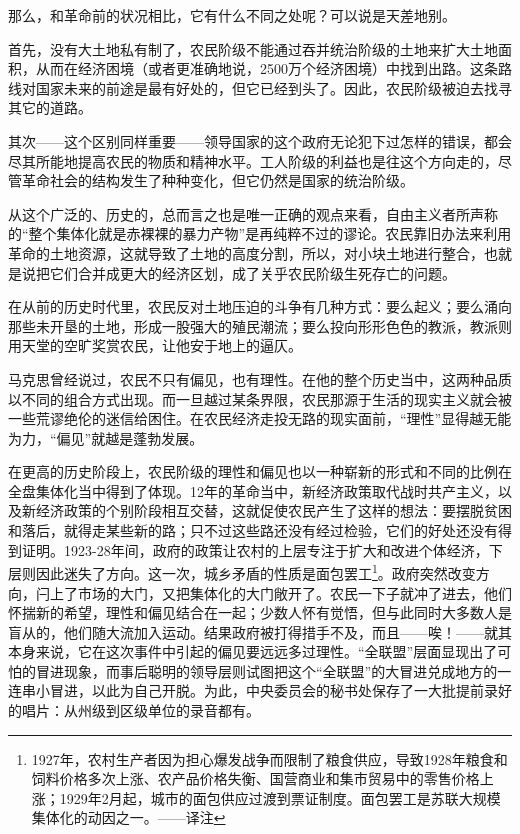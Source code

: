 \documentclass[UTF8, 12pt, a4paper]{ctexrep}
\begin{document}
那么，和革命前的状况相比，它有什么不同之处呢？可以说是天差地别。

首先，没有大土地私有制了，农民阶级不能通过吞并统治阶级的土地来扩大土地面积，从而在经济困境（或者更准确地说，2500万个经济困境）中找到出路。这条路线对国家未来的前途是最有好处的，但它已经到头了。因此，农民阶级被迫去找寻其它的道路。

其次——这个区别同样重要——领导国家的这个政府无论犯下过怎样的错误，都会尽其所能地提高农民的物质和精神水平。工人阶级的利益也是往这个方向走的，尽管革命社会的结构发生了种种变化，但它仍然是国家的统治阶级。

从这个广泛的、历史的，总而言之也是唯一正确的观点来看，自由主义者所声称的“整个集体化就是赤裸裸的暴力产物”是再纯粹不过的谬论。农民靠旧办法来利用革命的土地资源，这就导致了土地的高度分割，所以，对小块土地进行整合，也就是说把它们合并成更大的经济区划，成了关乎农民阶级生死存亡的问题。

在从前的历史时代里，农民反对土地压迫的斗争有几种方式：要么起义；要么涌向那些未开垦的土地，形成一股强大的殖民潮流；要么投向形形色色的教派，教派则用天堂的空旷奖赏农民，让他安于地上的逼仄。

马克思曾经说过，农民不只有偏见，也有理性。在他的整个历史当中，这两种品质以不同的组合方式出现。而一旦越过某条界限，农民那源于生活的现实主义就会被一些荒谬绝伦的迷信给困住。在农民经济走投无路的现实面前，“理性”显得越无能为力，“偏见”就越是蓬勃发展。

在更高的历史阶段上，农民阶级的理性和偏见也以一种崭新的形式和不同的比例在全盘集体化当中得到了体现。12年的革命当中，新经济政策取代战时共产主义，以及新经济政策的个别阶段相互交替，这就促使农民产生了这样的想法：要摆脱贫困和落后，就得走某些新的路；只不过这些路还没有经过检验，它们的好处还没有得到证明。1923-28年间，政府的政策让农村的上层专注于扩大和改进个体经济，下层则因此迷失了方向。这一次，城乡矛盾的性质是面包罢工\footnote{1927年，农村生产者因为担心爆发战争而限制了粮食供应，导致1928年粮食和饲料价格多次上涨、农产品价格失衡、国营商业和集市贸易中的零售价格上涨；1929年2月起，城市的面包供应过渡到票证制度。面包罢工是苏联大规模集体化的动因之一。——译注}。政府突然改变方向，闩上了市场的大门，又把集体化的大门敞开了。农民一下子就冲了进去，他们怀揣新的希望，理性和偏见结合在一起；少数人怀有觉悟，但与此同时大多数人是盲从的，他们随大流加入运动。结果政府被打得措手不及，而且——唉！——就其本身来说，它在这次事件中引起的偏见要远远多过理性。“全联盟”层面显现出了可怕的冒进现象，而事后聪明的领导层则试图把这个“全联盟”的大冒进兑成地方的一连串小冒进，以此为自己开脱。为此，中央委员会的秘书处保存了一大批提前录好的唱片：从州级到区级单位的录音都有。
\end{document}
